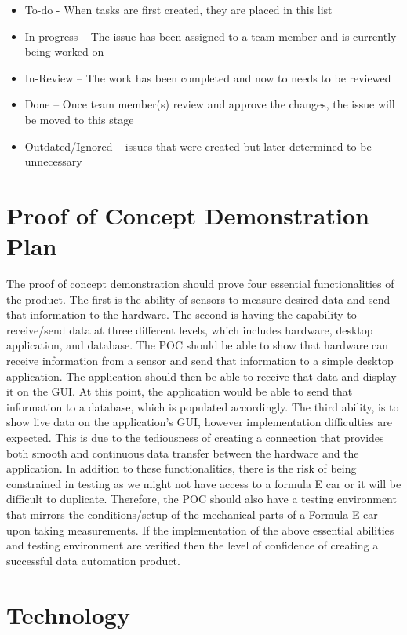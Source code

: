 \documentclass{article}
\begin{document}
\begin{itemize}
	\item To-do - When tasks are first created, they are placed in this list
	\item In-progress – The issue has been assigned to a team member and is currently being worked on
	\item In-Review – The work has been completed and now to needs to be reviewed
	\item Done – Once team member(s) review and approve the changes, the issue will be moved to this stage
	\item Outdated/Ignored – issues that were created but later determined to be unnecessary 
\end{itemize}

\section{Proof of Concept Demonstration Plan}

The proof of concept demonstration should prove four essential 
functionalities of the product. The first is the ability of sensors to measure 
desired data and send that information to the hardware. The second is having the capability to receive/send 
data at three different levels, which includes hardware, desktop application, and database. 
The POC should be able to show that hardware can receive information from a sensor and send that 
information to a simple desktop application. The application should then be able to receive that 
data and display it on the GUI. At this point, the application would be able to send that 
information to a database, which is populated accordingly. The third ability, 
is to show live data on the application’s GUI, however implementation difficulties are expected. 
This is due to the tediousness of creating a connection that provides both smooth and continuous 
data transfer between the hardware and the application. In addition to these functionalities, there 
is the risk of being constrained in testing as we might not have access to a formula E car or it will 
be difficult to duplicate. Therefore, the POC should also have a testing environment that mirrors the 
conditions/setup of the mechanical parts of a Formula E car upon taking measurements. If the implementation of 
the above essential abilities and testing environment are verified then the level of confidence of creating 
a successful data automation product. 

\section{Technology}
\end{document}
